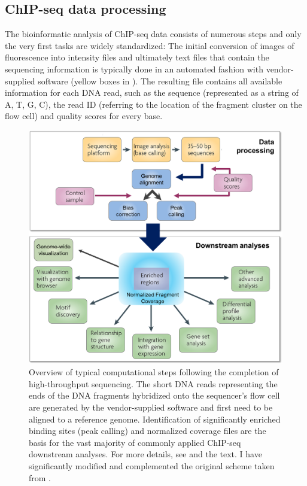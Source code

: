 \subsection{ChIP-seq data processing}
The bioinformatic analysis of ChIP-seq data consists of numerous steps and only the very first tasks are widely standardized: The initial conversion of images of fluorescence into intensity files and ultimately text files that contain the sequencing information is typically done in an automated fashion with vendor-supplied software \citep{Ledergerber2011} (yellow boxes in ). The resulting file contains all available information for each DNA read, such as the sequence (represented as a string of A, T, G, C), the read ID (referring to the location of the fragment cluster on the flow cell) and quality scores for every base. 
\begin{figure}[tb]
 \begin{minipage}[c]{0.6\textwidth}
   \includegraphics[width=\textwidth]{Figures/DataProcessing.png}
 \end{minipage}\hfill
 \begin{minipage}[c]{0.37\textwidth}
	\begin{footnotesize}
   \caption[Overview of typical computational steps following the completion of high-throughput sequencing.]{\textsf{Overview of typical computational steps following the completion of high-throughput sequencing. The short DNA reads representing the ends of the DNA fragments hybridized onto the sequencer's flow cell are generated by the vendor-supplied software and first need to be aligned to a reference genome. Identification of significantly enriched binding sites (peak calling) and normalized coverage files are the basis for the vast majority of commonly applied ChIP-seq downstream analyses. For more details, see  and the text. I have significantly modified and complemented the original scheme taken from \citet{Park2009}.}}
\label{fig:dataProcessing}
\end{footnotesize}
 \end{minipage}
\end{figure}
